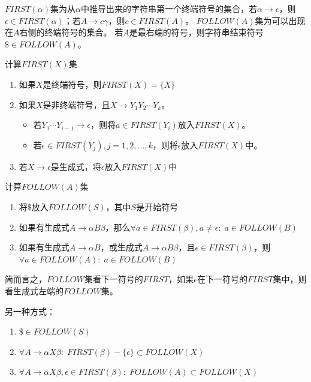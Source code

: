 \begin{definition}[FIRST集与FOLLOW集]
$FIRST(\alpha)$集为从$\alpha$中推导出来的字符串第一个终端符号的集合，若$\alpha\to\epsilon$，则$\epsilon\in FIRST(\alpha)$；若$A\to c\gamma$，则$c\in FIRST(A)$。
$FOLLOW(A)$集为可以出现在$A$右侧的终端符号的集合。
若$A$是最右端的符号，则字符串结束符号$\$\in FOLLOW(A)$。
\end{definition}

\begin{myalgorithm}
计算$FIRST(X)$集
\begin{enumerate}
	\item 如果$X$是终端符号，则$FIRST(X)=\{X\}$
	\item 如果$X$是非终端符号，且$X\to Y_1Y_2\cdots Y_k$。
\begin{itemize}
	\item 若$Y_1\cdots Y_{i-1}\to\epsilon$，则将$a\in FIRST(Y_i)$放入$FIRST(X)$。
	\item 若$\epsilon\in FIRST(Y_j),j=1,2,\ldots,k$，则将$\epsilon$放入$FIRST(X)$中。
\end{itemize}
	\item 若$X\to\epsilon$是生成式，将$\epsilon$放入$FIRST(X)$中
\end{enumerate}
\end{myalgorithm}

\begin{myalgorithm}
计算$FOLLOW(A)$集
\begin{enumerate}
	\item 将$\$$放入$FOLLOW(S)$，其中$S$是开始符号
	\item 如果有生成式$A\to\alpha B\beta$，那么$\forall a\in FIRST(\beta),a \ne\epsilon:\;a\in FOLLOW(B)$
	\item 如果有生成式$A\to\alpha B$，或生成式$A\to\alpha B\beta$，且$\epsilon\in FIRST(\beta)$，则$\forall a\in FOLLOW(A):\;a\in FOLLOW(B)$
\end{enumerate}
\end{myalgorithm}

简而言之，$FOLLOW$集看下一符号的$FIRST$，如果$\epsilon$在下一符号的$FIRST$集中，则看生成式左端的$FOLLOW$集。

另一种方式：
\begin{enumerate}
	\item \$$\in FOLLOW(S)$
	\item $\forall A\to\alpha X\beta:\;FIRST(\beta)-\{\epsilon\}\subset FOLLOW(X)$
	\item $\forall A\to\alpha X\beta,\epsilon\in FIRST(\beta):\;FOLLOW(A)\subset FOLLOW(X)$
\end{enumerate}

